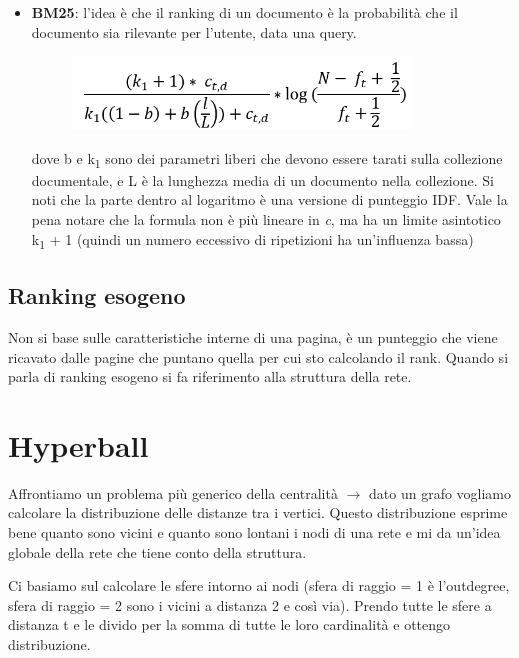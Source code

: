 \documentclass[12pt,italian]{report}
\begin{document}
\begin{itemize}
    \item \textbf{BM25}: l'idea è che il ranking di un documento è la probabilità che il documento sia rilevante per l'utente, data una query.
    
    \begin{figure}[h]
	\centering
	\includegraphics[width=90mm]{image/bm25_1.png}
	\label{fig:bm251}
    \end{figure}
    
    dove b e k\textsubscript{1} sono dei parametri liberi che devono essere tarati sulla collezione documentale, e L è la lunghezza media di un documento nella collezione. Si noti che la parte dentro al logaritmo è una versione di punteggio IDF. Vale la pena notare che la formula non è più lineare in \textit{c}, ma ha un limite asintotico k\textsubscript{1} + 1 (quindi un numero eccessivo di ripetizioni ha un'influenza bassa)
    
\end{itemize}

\section{Ranking esogeno}
\label{ranking esogeno}
Non si base sulle caratteristiche interne di una pagina, è un punteggio che viene ricavato dalle pagine che puntano quella per cui sto calcolando il rank. Quando si parla di ranking esogeno si fa riferimento alla struttura della rete. 
\clearpage

\chapter{Hyperball}
\label{cap:hyperball}
Affrontiamo un problema più generico della centralità $\rightarrow{}$ dato un grafo vogliamo calcolare la distribuzione delle distanze tra i vertici. Questo distribuzione esprime bene quanto sono vicini e quanto sono lontani i nodi di una rete e mi da un'idea globale della rete che tiene conto della struttura. 

Ci basiamo sul calcolare le sfere intorno ai nodi (sfera di raggio = 1 è l'outdegree, sfera di raggio = 2 sono i vicini a distanza 2 e così via). Prendo tutte le sfere a distanza t e le divido per la somma di tutte le loro cardinalità e ottengo distribuzione. 
\end{document}
